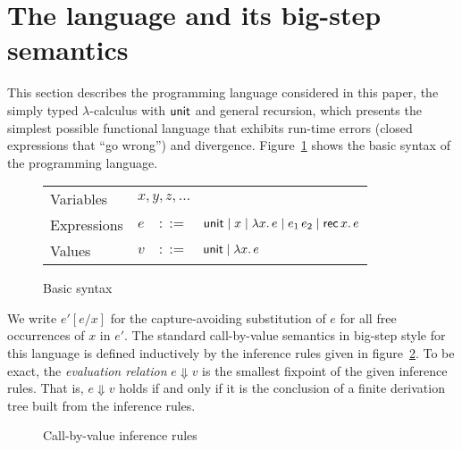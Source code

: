\documentclass[12pt,a2paper,draft]{article}
\newcommand{\abstr}[2]{\ensuremath{\lambda{#1}.\,{#2}}}
\newcommand{\app}[2]{\ensuremath{{#1}\,{#2}}}
\newcommand{\rec}[2]{\ensuremath{{\normalfont\textsf{rec}}\,{#1}.\,{#2}}}
\newcommand{\unit}{\ensuremath{\normalfont\textsf{unit}}}
\begin{document}
\section{The language and its big-step semantics}

This section describes the programming language considered in this paper,
the simply typed $\lambda$-calculus with $\unit$ and general recursion, which
presents the simplest possible functional language that exhibits run-time
errors (closed expressions that ``go wrong'') and divergence. Figure~\ref{figure:Basic_syntax}
shows the basic syntax of the programming language.

\begin{figure}[htb]
  \centering
  \begin{tabular}{llcl}
    Variables   & \multicolumn{3}{l}{$x,y,z,\ldots$} \\
    Expressions & $e$ & $::=$ & $\unit \mid x \mid \abstr{x}{e} \mid \app{e_1}{e_2} \mid \rec{x}{e}$ \\
    Values      & $v$ & $::=$ & $\unit \mid \abstr{x}{e}$
  \end{tabular}
  \caption{Basic syntax}
  \label{figure:Basic_syntax}
\end{figure}

We write $e'[e/x]$ for the capture-avoiding substitution of $e$ for all free occurrences
of $x$ in $e'$. The standard call-by-value semantics in big-step style for this language is
defined inductively by the inference rules given in figure~\ref{figure:Call_by_value_inference_rules}.
To be exact, the \emph{evaluation relation} $e \Downarrow v$ is the smallest fixpoint of
the given inference rules. That is, $e \Downarrow v$ holds if and only if it is the conclusion
of a finite derivation tree built from the inference rules.

\begin{figure}[htb]
  \centering
  \caption{Call-by-value inference rules}
  \label{figure:Call_by_value_inference_rules}
\end{figure}
\end{document}
